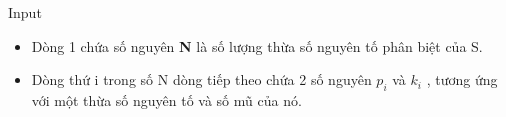 Input  
\begin{itemize}
	\item     Dòng 1 chứa số nguyên    \textbf{     N    }    là số lượng thừa số nguyên tố phân biệt của S.   
	\item     Dòng thứ i trong số N dòng tiếp theo chứa 2 số nguyên    \textbf{     $p_{i}$}    và    \textbf{     $k_{i}$}    , tương ứng với một thừa số nguyên tố và số mũ của nó.   
\end{itemize}